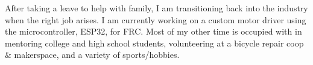 \vspace{1ex}
\hfill\begin{minipage}{\dimexpr\textwidth-2ex}
After taking a leave to help with family, I am transitioning back into the industry when the right job arises. I am currently working on a custom motor driver using the microcontroller, ESP32, for FRC. 
Most of my other time is occupied with in mentoring college and high school students, volunteering at a bicycle repair coop \& makerspace, and a variety of sports/hobbies. 
\end{minipage}